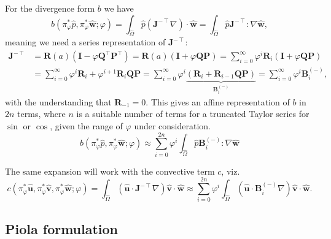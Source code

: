\documentclass[onecolumn, twoside, a4paper, 11pt]{article}
\begin{document}
For the divergence form $b$ we have
\begin{equation}
  b(
    \pi_{\varphi}^* \hat{p},
    \pi_{\varphi}^* \hat{\bm w};
    \varphi
  ) =
  \int_{\hat{\Omega}} \hat{p} (\bm J^{-\intercal} \nabla) \cdot \hat{\bm w}
  = \int_{\hat{\Omega}} \hat{p} \bm J^{-\intercal} : \nabla \hat{\bm w},
\end{equation}
meaning we need a series representation of $\bm J^{-\intercal}$:
\begin{align}
  \nonumber
  \bm J^{-\intercal}
  &= \bm R(a) (\bm I - \varphi \bm Q^\intercal \bm P^\intercal)
  = \bm R(a) (\bm I + \varphi \bm Q \bm P)
  = \sum_{i=0}^\infty
    \varphi^i \bm R_i
    (\bm I + \varphi \bm Q \bm P) \\
  &= \sum_{i=0}^\infty
    \varphi^i \bm R_i
    + \varphi^{i+1} \bm R_i \bm Q \bm P
  = \sum_{i=0}^\infty
    \varphi^i \underbrace{\left(
    \bm R_i + \bm R_{i-1} \bm Q \bm P
    \right)}_{\bm B^{(-)}_i}
  = \sum_{i=0}^\infty \varphi^i \bm B^{(-)}_i,
\end{align}
with the understanding that $\bm R_{-1} = 0$. This gives an affine
representation of $b$ in $2n$ terms, where $n$ is a suitable number of terms for
a truncated Taylor series for $\sin$ or $\cos$, given the range of $\varphi$
under consideration.
\begin{equation}
  b(
    \pi_{\varphi}^* \hat{p},
    \pi_{\varphi}^* \hat{\bm w};
    \varphi
  ) \approx \sum_{i=0}^{2n} \varphi^i
  \int_{\hat{\Omega}} \hat{p} \bm B^{(-)}_i : \nabla \hat{\bm w}
\end{equation}

The same expansion will work with the convective term $c$, viz.
\begin{equation}
  c(
    \pi_{\varphi}^* \hat{\bm u},
    \pi_{\varphi}^* \hat{\bm v},
    \pi_{\varphi}^* \hat{\bm w};
    \varphi
  )
  = \int_{\hat{\Omega}} (\hat{\bm u} \cdot \bm J^{-\intercal}\nabla) \hat{\bm v} \cdot \hat{\bm w}
  \approx \sum_{i=0}^{2n} \varphi^i \int_{\hat{\Omega}}
    (\hat{\bm u} \cdot \bm B^{(-)}_i \nabla) \hat{\bm v} \cdot \hat{\bm w}.
\end{equation}

\subsection{Piola formulation}
\end{document}
